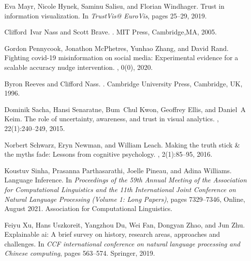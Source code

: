 \documentclass{article}
\begin{document}
\begin{thebibliography}{10}
Eva Mayr, Nicole Hynek, Saminu Salisu, and Florian Windhager.
\newblock Trust in information visualization.
\newblock In {\em TrustVis@ EuroVis}, pages 25--29, 2019.

Clifford~Ivar Nass and Scott Brave.
.
\newblock MIT Press, Cambridge,MA, 2005.

Gordon Pennycook, Jonathon McPhetres, Yunhao Zhang, and David Rand.
\newblock Fighting covid-19 misinformation on social media: Experimental
  evidence for a scalable accuracy nudge intervention.
, 0(0), 2020.

Byron Reeves and Clifford Nass.
.
\newblock Cambridge University Press, Cambridge, UK, 1996.

Dominik Sacha, Hansi Senaratne, Bum~Chul Kwon, Geoffrey Ellis, and Daniel~A
  Keim.
\newblock The role of uncertainty, awareness, and trust in visual analytics.
,
  22(1):240--249, 2015.

Norbert Schwarz, Eryn Newman, and William Leach.
\newblock Making the truth stick \& the myths fade: Lessons from cognitive
  psychology.
, 2(1):85--95, 2016.

Koustuv Sinha, Prasanna Parthasarathi, Joelle Pineau, and Adina Williams.
 {L}anguage {I}nference.
\newblock In {\em Proceedings of the 59th Annual Meeting of the Association for
  Computational Linguistics and the 11th International Joint Conference on
  Natural Language Processing (Volume 1: Long Papers)}, pages 7329--7346,
  Online, August 2021. Association for Computational Linguistics.

Feiyu Xu, Hans Uszkoreit, Yangzhou Du, Wei Fan, Dongyan Zhao, and Jun Zhu.
\newblock Explainable ai: A brief survey on history, research areas, approaches
  and challenges.
\newblock In {\em CCF international conference on natural language processing
  and Chinese computing}, pages 563--574. Springer, 2019.

\end{thebibliography}
\end{document}

